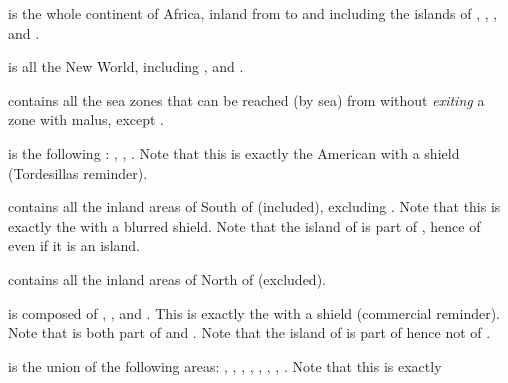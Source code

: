 \begin{deflist}
\item[\anchorcontinent{Africa}] is the whole continent of Africa, inland from
  \granderegionMauritanie to \granderegionSoudan and including the islands of
  , ,
  ,  and
  .
\item[\anchorcontinent{America}] is all the New World, including
  ,  and .
\item[\anchorregion{Atlantic}] contains all the \ROTW sea zones that can be
  reached (by sea) from  without \emph{exiting} a zone
  with malus, except \seazoneHorn.
\item[\anchorcontinent{Brazil}] is the following \Areas: ,
  , . Note that this is exactly the
  American \Areas with a  shield (Tordesillas reminder).
\item[\anchorcontinent{Spanish World}] contains all the inland areas of
   South of  (included), excluding
  . Note that this is exactly the \Areas with a blurred
   shield. Note that the island of \provinceTrinidad is
  part of \granderegionGuyana, hence of  even if it
  is an island.
\item[\anchorcontinent{North America}] contains all the inland areas of
   North of  (excluded).
\item[\anchorcontinent{Caraibes}] is composed of ,
  ,  and
  . This is exactly the \Areas with a
   shield (commercial reminder). Note that
  \granderegionFlorida is both part of  and
  \continentCaraibes. Note that the island of \provinceTrinidad is part of
  \granderegionGuyana hence not of .
\item[\anchorcontinent{Extreme Orient}] is the union of the following areas:
  , , \granderegionCoree,
  , , ,
  , \granderegionPhilippines. Note that this is exactly

\end{deflist}
